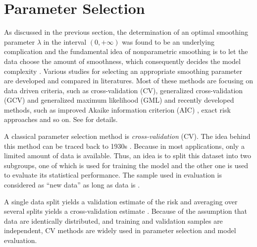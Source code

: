 \section{Parameter Selection}

As discussed in the previous section, the determination of an optimal smoothing parameter $\lambda$ in the interval $(0,+\infty)$ was found to be an underlying complication and the fundamental idea of nonparametric smoothing is to let the data choose the amount of smoothness, which consequently decides the model complexity \citep{gu1998model}. Various studies for selecting an appropriate smoothing parameter are developed and compared in literatures. Most of these methods are focusing on data driven criteria, such as cross-validation (CV), generalized cross-validation (GCV) \citep{craven1978smoothing} and generalized maximum likelihood (GML) \citep{wahba1985comparison} and recently developed methods, such as improved Akaike information criterion (AIC) \citep{hurvich1998smoothing}, exact risk approaches \citep{wand1997exact} and so on. See \eg \cite{craven1978smoothing, hardle1988far, hardle1990applied, wahba1990spline, green1993nonparametric, cantoni2001resistant, aydin2013smoothing} for details.  



A classical parameter selection method is \textit{cross-validation} (CV). The idea behind this method can be traced back to 1930s \citep{larson1931shrinkage}. Because in most applications, only a limited amount of data is available. Thus, an idea is to split this dataset into two subgroups, one of which is used for training the model and the other one is used to evaluate its statistical performance. The sample used in evaluation is considered as ``new data'' as long as data is \iid. 

A single data split yields a validation estimate of the risk and averaging over several splits yields a cross-validation estimate \citep{arlot2010survey}. Because of the assumption that data are identically distributed, and training and validation samples are independent, CV methods are widely used in parameter selection and model evaluation. 


